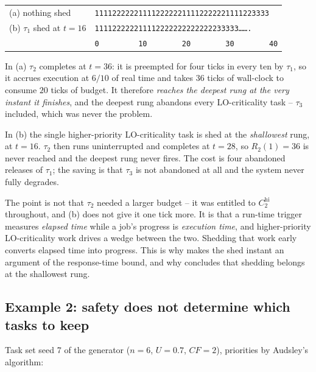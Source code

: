 \documentclass{article}
\begin{document}
\begin{center}
\begin{tabular}{ll}
\toprule
(a) nothing shed & \texttt{1111222222111122222211112222221111223333} \\
(b) $\tau_1$ shed at $t = 16$ & \texttt{111122222211112222222222222233333\ldots\ldots.} \\
 & \texttt{0~~~~~~~~~10~~~~~~~~20~~~~~~~~30~~~~~~~~40} \\
\bottomrule
\end{tabular}
\end{center}

\noindent In (a) $\tau_2$ completes at $t = 36$: it is preempted for four ticks
in every ten by $\tau_1$, so it accrues execution at $6/10$ of real time and
takes $36$ ticks of wall-clock to consume $20$ ticks of budget. It therefore
\emph{reaches the deepest rung at the very instant it finishes}, and the
deepest rung abandons every LO-criticality task -- $\tau_3$ included, which was
never the problem.

In (b) the single higher-priority LO-criticality task is shed at the
\emph{shallowest} rung, at $t = 16$. $\tau_2$ then runs uninterrupted and
completes at $t = 28$, so $R_2(1) = 36$ is never reached and the deepest rung
never fires. The cost is four abandoned releases of $\tau_1$; the saving is
that $\tau_3$ is not abandoned at all and the system never fully degrades.

The point is not that $\tau_2$ needed a larger budget -- it was entitled to
$C_2^{\mathrm{hi}}$ throughout, and (b) does not give it one tick more. It is
that a run-time trigger measures \emph{elapsed time} while a job's progress is
\emph{execution time}, and higher-priority LO-criticality work drives a wedge
between the two. Shedding that work early converts elapsed time into progress.
This is why  makes the shed instant an argument of the
response-time bound, and why  concludes that shedding
belongs at the shallowest rung.

\subsection{Example 2: safety does not determine which tasks to keep}
\label{sec:ex-order}

Task set seed 7 of the generator ($n = 6$, $U = 0.7$, $CF = 2$), priorities by
Audsley's algorithm:
\end{document}
